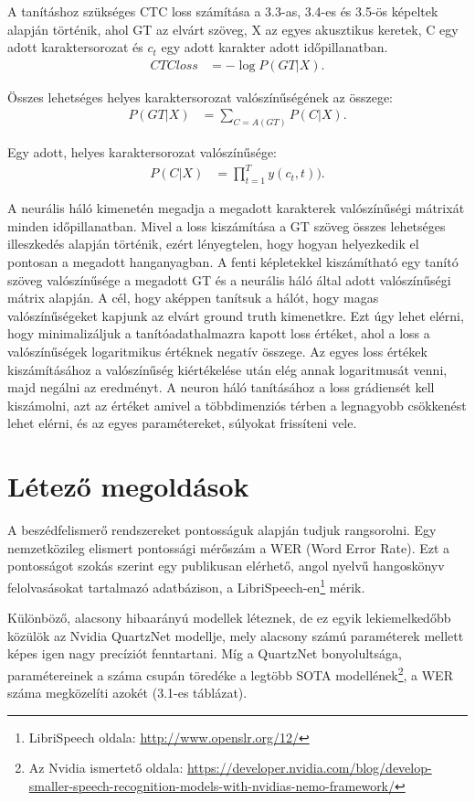 A tanításhoz szükséges CTC loss számítása a 3.3-as, 3.4-es és 3.5-ös képeltek alapján történik, ahol GT az elvárt szöveg, X az egyes akusztikus keretek, C egy adott karaktersorozat és $c_t$ egy adott karakter adott időpillanatban.
\begin{align}
CTC loss&=-\log{P(GT | X)}.
\end{align}

Összes lehetséges helyes karaktersorozat valószínűségének az összege:
\begin{align}
P(GT | X)&=\sum_{C=A(GT)} P(C | X).
\end{align}

Egy adott, helyes karaktersorozat valószínűsége:
\begin{align}
P(C | X)&=\prod_{t=1}^{T} y(c_t, t)).
\end{align}

A neurális háló kimenetén megadja a megadott karakterek valószínűségi mátrixát minden időpillanatban. Mivel a loss kiszámítása a GT szöveg összes lehetséges illeszkedés alapján történik, ezért lényegtelen, hogy hogyan helyezkedik el pontosan a megadott hanganyagban. A fenti képletekkel kiszámítható egy tanító szöveg valószínűsége a megadott GT és a neurális háló által adott valószínűségi mátrix alapján. A cél, hogy aképpen tanítsuk a hálót, hogy magas valószínűségeket kapjunk az elvárt ground truth kimenetkre. Ezt úgy lehet elérni, hogy minimalizáljuk a tanítóadathalmazra kapott loss értéket, ahol a loss a valószínűségek logaritmikus értéknek negatív összege. Az egyes loss értékek kiszámításához a valószínűség kiértékelése után elég annak logaritmusát venni, majd negálni az eredményt. A neuron háló tanításához a loss grádiensét kell kiszámolni, azt az értéket amivel a többdimenziós térben a legnagyobb csökkenést lehet elérni, és az egyes paramétereket, súlyokat frissíteni vele\cite{ctc}.

\section{Létező megoldások}

A beszédfelismerő rendszereket pontosságuk alapján tudjuk rangsorolni. Egy nemzetközileg elismert pontossági mérőszám a WER (Word Error Rate). Ezt a pontosságot szokás szerint egy publikusan elérhető, angol nyelvű hangoskönyv felolvasásokat tartalmazó adatbázison, a LibriSpeech-en\footnote{LibriSpeech oldala: \url{http://www.openslr.org/12/}} mérik.

Különböző, alacsony hibaarányú modellek léteznek, de ez egyik lekiemelkedőbb közülök az Nvidia QuartzNet modellje, mely alacsony számú paraméterek mellett képes igen nagy precíziót fenntartani. Míg a QuartzNet bonyolultsága, paramétereinek a száma csupán töredéke a legtöbb SOTA modellének\footnote{Az Nvidia ismertető oldala: \url{https://developer.nvidia.com/blog/develop-smaller-speech-recognition-models-with-nvidias-nemo-framework/}}, a WER száma megközelíti azokét (3.1-es táblázat).

